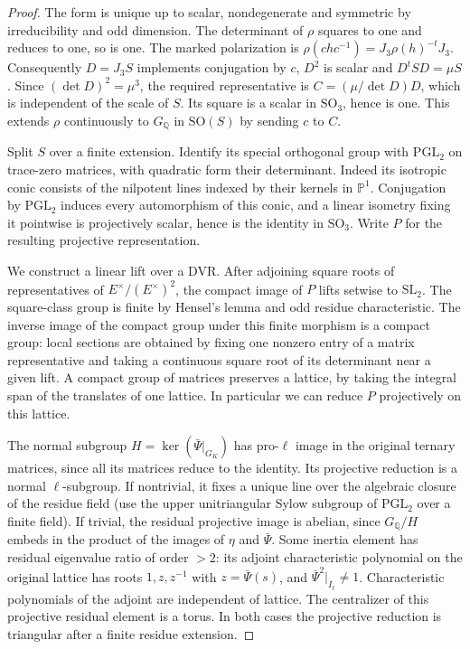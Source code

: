 \begin{proof}
The form is unique up to scalar, nondegenerate and symmetric by
irreducibility and odd dimension. The determinant of \(\rho\)
squares to one and reduces to one, so is one. The marked polarization
is \(\rho(chc^{-1})=J_3\rho(h)^{-t}J_3\). Consequently \(D=J_3S\)
implements conjugation by \(c\), \(D^2\) is scalar and
\(D^t S D=\mu S\). Since \((\det D)^2=\mu^3\), the required
representative is \(C=(\mu/\det D)D\), which is independent of the
scale of \(S\). Its square is a scalar in \(\mathrm{SO}_3\), hence
is one. This extends \(\rho\) continuously to \(G_{\mathbb Q}\)
in \(\mathrm{SO}(S)\) by sending \(c\) to \(C\).

Split \(S\) over a finite extension. Identify its special orthogonal
group with \(\mathrm{PGL}_2\) on trace-zero matrices, with quadratic
form their determinant. Indeed its isotropic conic consists of the
nilpotent lines indexed by their kernels in \(\mathbb P^1\).
Conjugation by \(\mathrm{PGL}_2\) induces every automorphism of this
conic, and a linear isometry fixing it pointwise is projectively
scalar, hence is the identity in \(\mathrm{SO}_3\). Write \(P\) for
the resulting projective representation.

We construct a linear lift over a DVR. After adjoining square roots
of representatives of \(E^\times/(E^\times)^2\), the compact image
of \(P\) lifts setwise to \(\mathrm{SL}_2\). The square-class
group is finite by Hensel's lemma and odd residue characteristic.
The inverse image of the compact group under this finite morphism
is a compact group: local sections are obtained by fixing one
nonzero entry of a matrix representative and taking a continuous
square root of its determinant near a given lift. A compact group
of matrices preserves a lattice, by taking the integral span of
the translates of one lattice. In particular we can reduce \(P\)
projectively on this lattice.

The normal subgroup \(H=\ker(\bar\Psi|_{G_K})\) has pro-\(\ell\)
image in the original ternary matrices, since all its matrices
reduce to the identity. Its projective reduction is a normal
\(\ell\)-subgroup. If nontrivial, it fixes a unique line over the
algebraic closure of the residue field (use the upper unitriangular
Sylow subgroup of \(\mathrm{PGL}_2\) over a finite field).
If trivial, the residual projective image is abelian, since
\(G_{\mathbb Q}/H\) embeds in the product of the images of \(\eta\)
and \(\bar\Psi\). Some inertia element has residual eigenvalue
ratio of order \(>2\): its adjoint characteristic polynomial on
the original lattice has roots \(1,z,z^{-1}\) with
\(z=\bar\Psi(s)\), and \(\bar\Psi^2|_{I_\ell}\ne1\).
Characteristic polynomials of the adjoint are independent of
lattice. The centralizer of this projective residual element is a
torus. In both cases the projective reduction is triangular after
a finite residue extension.


\end{proof}
